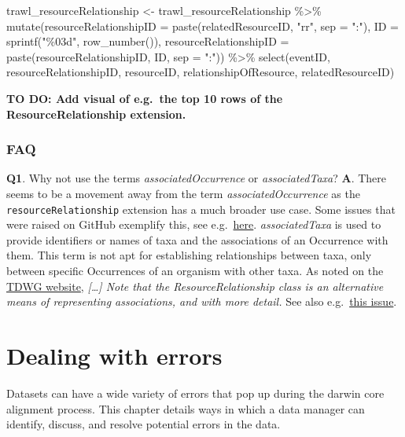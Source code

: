 \documentclass[
]{book}
\newenvironment{Shaded}{\begin{snugshade}}{\end{snugshade}}
\newcommand{\AttributeTok}[1]{\textcolor[rgb]{0.77,0.63,0.00}{#1}}
\newcommand{\FunctionTok}[1]{\textcolor[rgb]{0.00,0.00,0.00}{#1}}
\newcommand{\NormalTok}[1]{#1}
\newcommand{\OtherTok}[1]{\textcolor[rgb]{0.56,0.35,0.01}{#1}}
\newcommand{\SpecialCharTok}[1]{\textcolor[rgb]{0.00,0.00,0.00}{#1}}
\newcommand{\StringTok}[1]{\textcolor[rgb]{0.31,0.60,0.02}{#1}}
\begin{document}
\begin{Shaded}
\begin{Highlighting}[]
\NormalTok{trawl\_resourceRelationship }\OtherTok{\textless{}{-}}\NormalTok{ trawl\_resourceRelationship }\SpecialCharTok{\%\textgreater{}\%}
  \FunctionTok{mutate}\NormalTok{(}\AttributeTok{resourceRelationshipID =} \FunctionTok{paste}\NormalTok{(relatedResourceID, }\StringTok{"rr"}\NormalTok{, }\AttributeTok{sep =} \StringTok{":"}\NormalTok{),}
         \AttributeTok{ID =} \FunctionTok{sprintf}\NormalTok{(}\StringTok{"\%03d"}\NormalTok{, }\FunctionTok{row\_number}\NormalTok{()),}
         \AttributeTok{resourceRelationshipID =} \FunctionTok{paste}\NormalTok{(resourceRelationshipID, ID, }\AttributeTok{sep =} \StringTok{":"}\NormalTok{)) }\SpecialCharTok{\%\textgreater{}\%}
  \FunctionTok{select}\NormalTok{(eventID, resourceRelationshipID, resourceID, relationshipOfResource, relatedResourceID)}
\end{Highlighting}
\end{Shaded}

\textbf{TO DO: Add visual of e.g.~the top 10 rows of the ResourceRelationship extension.}

\hypertarget{faq}{%
\subsection{FAQ}\label{faq}}

\textbf{Q1}. Why not use the terms \emph{associatedOccurrence} or \emph{associatedTaxa}?
\textbf{A}. There seems to be a movement away from the term \emph{associatedOccurrence} as the \texttt{resourceRelationship} extension has a much broader use case. Some issues that were raised on GitHub exemplify this, see e.g.~\href{https://github.com/tdwg/dwc/issues/324}{here}. \emph{associatedTaxa} is used to provide identifiers or names of taxa and the associations of an Occurrence with them. This term is not apt for establishing relationships between taxa, only between specific Occurrences of an organism with other taxa. As noted on the \href{https://dwc.tdwg.org/terms/\#dwc:associatedTaxa}{TDWG website}, \emph{{[}\ldots{]} Note that the ResourceRelationship class is an alternative means of representing associations, and with more detail.} See also e.g.~\href{https://github.com/tdwg/dwc/issues/331}{this issue}.

\hypertarget{dealing-with-errors}{%
\chapter{Dealing with errors}\label{dealing-with-errors}}

Datasets can have a wide variety of errors that pop up during the darwin core alignment process. This chapter details
ways in which a data manager can identify, discuss, and resolve potential errors in the data.
\end{document}
